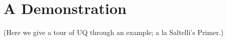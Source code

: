 \documentclass[../primer.tex]{subfiles}
\begin{document}
\chapter{A Demonstration}
(Here we give a tour of UQ through an example; a la Saltelli's Primer.)
\end{document}
